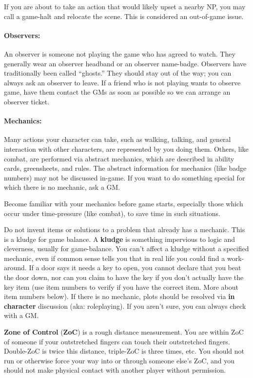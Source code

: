 \documentclass[sheet]{GL2020}
\begin{document}
If you are about to take an action that would likely upset a nearby NP, you may call a game-halt and relocate the scene. This is considered an out-of-game issue.

\paragraph{Observers:} An observer is someone not playing the game who has agreed to watch.  They generally wear an observer headband or an observer name-badge.  Observers have traditionally been called ``ghosts.''  They should stay out of the way; you can always ask an observer to leave.  If a friend who is not playing wants to observe game, have them contact the GMs as soon as possible so we can arrange an observer ticket.

\paragraph{Mechanics:} Many actions your character can take, such as walking, talking, and general interaction with other characters, are represented by you doing them.  Others, like combat, are performed via abstract mechanics, which are described in ability cards, greensheets, and rules.  The abstract information for mechanics (like badge numbers) may not be discussed in-game.  If you want to do something special for which there is no mechanic, ask a GM.

Become familiar with your mechanics before game starts, especially those which occur under time-pressure (like combat), to save time in such situations.

Do not invent items or solutions to a problem that already has a mechanic. This is a kludge for game balance. A \textbf{kludge} is something impervious to logic and cleverness, usually for game-balance.  You can't affect a kludge without a specified mechanic, even if common sense tells you that in real life you could find a work-around. If a door says it needs a key to open, you cannot declare that you beat the door down, nor can you claim to have the key if you don't actually have the key item (use item numbers to verify if you have the correct item. More about item numbers below).  If there is no mechanic, plots should be resolved via \textbf{in character} discussion (aka: roleplaying). If you aren't sure, you can always check with a GM. 

{\bf Zone of Control} ({\bf ZoC}) is a rough distance measurement. You are within ZoC of someone if your outstretched fingers can touch their outstretched fingers.  Double-ZoC is twice this distance, triple-ZoC is three times, etc. You should not run or otherwise force your way into or through someone else's ZoC, and you should not make physical contact with another player without permission.
\end{document}
